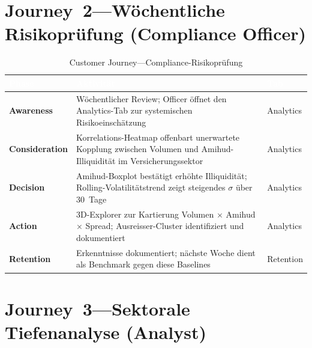 \documentclass[11pt, a4paper, oneside, openany]{report}
\begin{document}
\section{Journey~2\;---\;Wöchentliche Risikoprüfung (Compliance Officer)}

\begin{table}[H]
\centering
\caption{Customer Journey\;---\;Compliance-Risikoprüfung}
\label{tab:journey-compliance}
\sffamily\small
\begin{tabularx}{\textwidth}{>{\bfseries}l X l}
  \toprule
  \rowcolor{DeepNavy} \textcolor{white}{\textbf{Phase}} & \textcolor{white}{\textbf{Aktivität}} & \textcolor{white}{\textbf{Tab}} \\
  \midrule
  Awareness     & Wöchentlicher Review; Officer öffnet den Analytics-Tab zur systemischen Risikoeinschätzung & Analytics \\
  Consideration & Korrelations-Heatmap offenbart unerwartete Kopplung zwischen Volumen und Amihud-Illiquidität im Versicherungssektor & Analytics \\
  Decision      & Amihud-Boxplot bestätigt erhöhte Illiquidität; Rolling-Volatilitätstrend zeigt steigendes $\sigma$ über 30~Tage & Analytics \\
  Action        & 3D-Explorer zur Kartierung Volumen $\times$ Amihud $\times$ Spread; Ausreisser-Cluster identifiziert und dokumentiert & Analytics \\
  Retention     & Erkenntnisse dokumentiert; nächste Woche dient als Benchmark gegen diese Baselines & Retention \\
  \bottomrule
\end{tabularx}
\end{table}

\section{Journey~3\;---\;Sektorale Tiefenanalyse (Analyst)}
\end{document}
